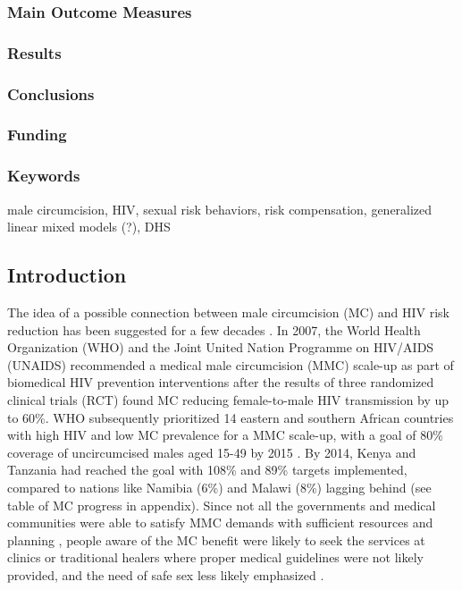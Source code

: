 \documentclass[12pt,]{article}
\begin{document}
\subsubsection{Main Outcome Measures}\label{main-outcome-measures}

\subsubsection{Results}\label{results}

\subsubsection{Conclusions}\label{conclusions}

\subsubsection{Funding}\label{funding}

\subsubsection{Keywords}\label{keywords}

male circumcision, HIV, sexual risk behaviors, risk compensation,
generalized linear mixed models (?), DHS

\subsection{Introduction}\label{introduction}

The idea of a possible connection between male circumcision (MC) and HIV
risk reduction has been suggested for a few decades
\autocites{Acle86}{CameSimo89}{Lind88}{HalpBail99}. In 2007, the World
Health Organization (WHO) and the Joint United Nation Programme on
HIV/AIDS (UNAIDS) recommended a medical male circumcision (MMC) scale-up
as part of biomedical HIV prevention interventions \autocite{WHO07a}
after the results of three randomized clinical trials (RCT)
\autocites{AuveTalj05}{BailMose07}{GrayKigo07} found MC reducing
female-to-male HIV transmission by up to 60\%. WHO subsequently
prioritized 14 eastern and southern African countries with high HIV and
low MC prevalence for a MMC scale-up, with a goal of 80\% coverage of
uncircumcised males aged 15-49 by 2015 \autocite{WHO11a}. By 2014, Kenya
and Tanzania had reached the goal with 108\% and 89\% targets
implemented, compared to nations like Namibia (6\%) and Malawi (8\%)
lagging behind \autocite{WHO15} (see table of MC progress in appendix).
Since not all the governments and medical communities were able to
satisfy MMC demands with sufficient resources and planning
\autocite{CurrNjeu11}, people aware of the MC benefit were likely to
seek the services at clinics or traditional healers where proper medical
guidelines were not likely provided, and the need of safe sex less
likely emphasized \autocite{GreeMaha13}.
\end{document}

